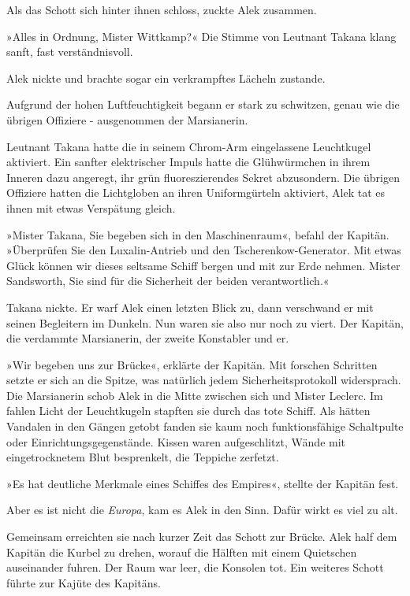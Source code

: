 Als das Schott sich hinter ihnen schloss, zuckte Alek zusammen.

»Alles in Ordnung, Mister Wittkamp?« Die Stimme von Leutnant Takana
klang sanft, fast verständnisvoll.

Alek nickte und brachte sogar ein verkrampftes Lächeln zustande.

Aufgrund der hohen Luftfeuchtigkeit begann er stark zu schwitzen,
genau wie die übrigen Offiziere - ausgenommen der Marsianerin.

Leutnant Takana hatte die in seinem Chrom-Arm eingelassene
Leuchtkugel aktiviert. Ein sanfter elektrischer Impuls hatte die
Glühwürmchen in ihrem Inneren dazu angeregt, ihr grün
fluoreszierendes Sekret abzusondern. Die übrigen Offiziere hatten
die Lichtgloben an ihren Uniformgürteln aktiviert, Alek tat es
ihnen mit etwas Verspätung gleich.

»Mister Takana, Sie begeben sich in den Maschinenraum«, befahl der
Kapitän. »Überprüfen Sie den Luxalin-Antrieb und den
Tscheren\-kow-Generator. Mit etwas Glück können wir dieses seltsame
Schiff bergen und mit zur Erde nehmen. Mister Sandsworth, Sie sind
für die Sicherheit der beiden verantwortlich.«

Takana nickte. Er warf Alek einen letzten Blick zu, dann verschwand
er mit seinen Begleitern im Dunkeln. Nun waren sie also nur noch zu
viert. Der Kapitän, die verdammte Marsianerin, der zweite
Konstabler und er.

»Wir begeben uns zur Brücke«, erklärte der Kapitän. Mit forschen
Schritten setzte er sich an die Spitze, was natürlich jedem
Sicherheitsprotokoll widersprach. Die Marsianerin schob Alek in die
Mitte zwischen sich und Mister Leclerc. Im fahlen Licht der
Leuchtkugeln stapften sie durch das tote Schiff. Als hätten
Vandalen in den Gängen getobt fanden sie kaum noch funktionsfähige
Schaltpulte oder Einrichtungsgegenstände. Kissen waren
aufgeschlitzt, Wände mit eingetrocknetem Blut besprenkelt, die
Teppiche zerfetzt.

»Es hat deutliche Merkmale eines Schiffes des Empires«, stellte der
Kapitän fest.

Aber es ist nicht die \textit{Europa}, kam es Alek in den Sinn. Dafür wirkt
es viel zu alt.

Gemeinsam erreichten sie nach kurzer Zeit das Schott zur Brücke.
Alek half dem Kapitän die Kurbel zu drehen, worauf die Hälften mit
einem Quietschen auseinander fuhren. Der Raum war leer, die
Konsolen tot. Ein weiteres Schott führte zur Kajüte des Kapitäns.


